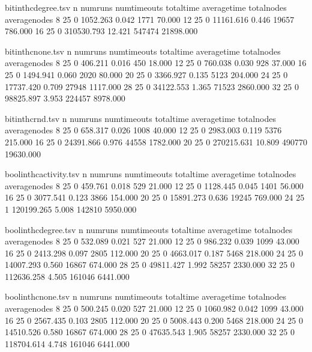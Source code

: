 \begin{filecontents}{bitinthcdegree.tsv}
	n	numruns	numtimeouts	totaltime	averagetime	totalnodes	averagenodes
	8	25	0	1052.263	0.042	1771	70.000
	12	25	0	11161.616	0.446	19657	786.000
	16	25	0	310530.793	12.421	547474	21898.000
\end{filecontents}

\begin{filecontents}{bitinthcnone.tsv}
	n	numruns	numtimeouts	totaltime	averagetime	totalnodes	averagenodes
	8	25	0	406.211	0.016	450	18.000
	12	25	0	760.038	0.030	928	37.000
	16	25	0	1494.941	0.060	2020	80.000
	20	25	0	3366.927	0.135	5123	204.000
	24	25	0	17737.420	0.709	27948	1117.000
	28	25	0	34122.553	1.365	71523	2860.000
	32	25	0	98825.897	3.953	224457	8978.000
\end{filecontents}

\begin{filecontents}{bitinthcrnd.tsv}
	n	numruns	numtimeouts	totaltime	averagetime	totalnodes	averagenodes
	8	25	0	658.317	0.026	1008	40.000
	12	25	0	2983.003	0.119	5376	215.000
	16	25	0	24391.866	0.976	44558	1782.000
	20	25	0	270215.631	10.809	490770	19630.000
\end{filecontents}

\begin{filecontents}{boolinthcactivity.tsv}
	n	numruns	numtimeouts	totaltime	averagetime	totalnodes	averagenodes
	8	25	0	459.761	0.018	529	21.000
	12	25	0	1128.445	0.045	1401	56.000
	16	25	0	3077.541	0.123	3866	154.000
	20	25	0	15891.273	0.636	19245	769.000
	24	25	1	120199.265	5.008	142810	5950.000
\end{filecontents}

\begin{filecontents}{boolinthcdegree.tsv}
	n	numruns	numtimeouts	totaltime	averagetime	totalnodes	averagenodes
	8	25	0	532.089	0.021	527	21.000
	12	25	0	986.232	0.039	1099	43.000
	16	25	0	2413.298	0.097	2805	112.000
	20	25	0	4663.017	0.187	5468	218.000
	24	25	0	14007.293	0.560	16867	674.000
	28	25	0	49811.427	1.992	58257	2330.000
	32	25	0	112636.258	4.505	161046	6441.000
\end{filecontents}

\begin{filecontents}{boolinthcnone.tsv}
	n	numruns	numtimeouts	totaltime	averagetime	totalnodes	averagenodes
	8	25	0	500.245	0.020	527	21.000
	12	25	0	1060.982	0.042	1099	43.000
	16	25	0	2567.435	0.103	2805	112.000
	20	25	0	5008.443	0.200	5468	218.000
	24	25	0	14510.526	0.580	16867	674.000
	28	25	0	47635.543	1.905	58257	2330.000
	32	25	0	118704.614	4.748	161046	6441.000
\end{filecontents}

